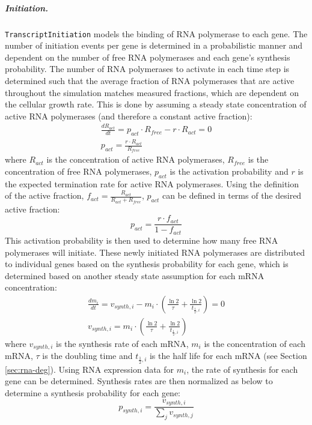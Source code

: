 \documentclass[12pt]{article}
\begin{document}
\subparagraph{Initiation.}
\texttt{TranscriptInitiation} models the binding of RNA polymerase to each gene. The number of initiation events per gene is determined in a probabilistic manner and dependent on the number of free RNA polymerases and each gene's synthesis probability. The number of RNA polymerases to activate in each time step is determined such that the average fraction of RNA polymerases that are active throughout the simulation matches measured fractions, which are dependent on the cellular growth rate. This is done by assuming a steady state concentration of active RNA polymerases (and therefore a constant active fraction):
\begin{gather}
    \frac{dR_{act}}{dt} = p_{act}\cdot R_{free} - r\cdot R_{act} = 0 \\
    p_{act} = \frac{r\cdot R_{act}}{R_{free}}
\end{gather}
\noindent where $R_{act}$ is the concentration of active RNA polymerases, $R_{free}$ is the concentration of free RNA polymerases, $p_{act}$ is the activation probability and $r$ is the expected termination rate for active RNA polymerases. Using the definition of the active fraction, $f_{act} = \frac{R_{act}}{R_{act} + R_{free}}$, $p_{act}$ can be defined in terms of the desired active fraction:
\begin{equation}
    p_{act} = \frac{r\cdot f_{act}}{1 - f_{act}}
\end{equation}
\noindent This activation probability is then used to determine how many free RNA polymerases will initiate.  These newly initiated RNA polymerases are distributed to individual genes based on the synthesis probability for each gene, which is determined based on another steady state assumption for each mRNA concentration:
\begin{gather}
    \frac{dm_i}{dt} = v_{synth, i} - m_i \cdot \left(\frac{\ln 2}{\tau} + \frac{\ln 2}{t_{\frac{1}{2}, i}}\right) = 0 \\
    v_{synth, i} = m_i \cdot \left(\frac{\ln 2}{\tau} + \frac{\ln 2}{t_{\frac{1}{2}, i}}\right)
\end{gather}
\noindent where $v_{synth, i}$ is the synthesis rate of each mRNA, $m_i$ is the concentration of each mRNA, $\tau$ is the doubling time and $t_{\frac{1}{2}, i}$ is the half life for each mRNA (see Section \ref{sec:rna-deg}). Using RNA expression data for $m_i$, the rate of synthesis for each gene can be determined.  Synthesis rates are then normalized as below to determine a synthesis probability for each gene:
\begin{equation}
    p_{synth, i} = \frac{v_{synth, i}}{\sum\limits_j v_{synth, j}}
\end{equation}
\end{document}
